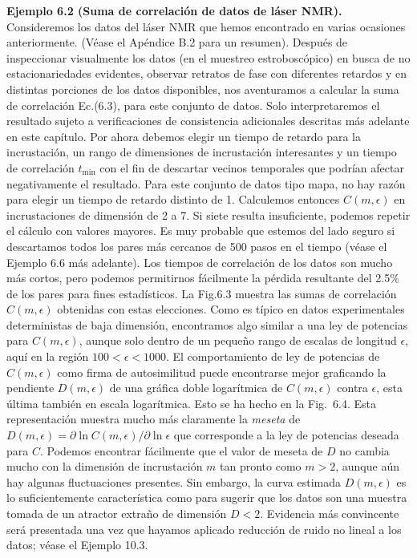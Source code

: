\documentclass[10pt,a4paper]{book}
\begin{document}
\textbf{Ejemplo 6.2 (Suma de correlación de datos de láser NMR).} Consideremos los datos del láser NMR que hemos encontrado en varias ocasiones anteriormente. (Véase el Apéndice B.2 para un resumen). Después de inspeccionar visualmente los datos (en el muestreo estroboscópico) en busca de no estacionariedades evidentes, observar retratos de fase con diferentes retardos y en distintas porciones de los datos disponibles, nos aventuramos a calcular la suma de correlación Ec.(6.3), para este conjunto de datos. Solo interpretaremos el resultado sujeto a verificaciones de consistencia adicionales descritas más adelante en este capítulo. Por ahora debemos elegir un tiempo de retardo para la incrustación, un rango de dimensiones de incrustación interesantes y un tiempo de correlación $t_{\min}$ con el fin de descartar vecinos temporales que podrían afectar negativamente el resultado. Para este conjunto de datos tipo mapa, no hay razón para elegir un tiempo de retardo distinto de 1. Calculemos entonces $C(m, \epsilon)$ en incrustaciones de dimensión de 2 a 7. Si siete resulta insuficiente, podemos repetir el cálculo con valores mayores. Es muy probable que estemos del lado seguro si descartamos todos los pares más cercanos de 500 pasos en el tiempo (véase el Ejemplo 6.6 más adelante). Los tiempos de correlación de los datos son mucho más cortos, pero podemos permitirnos fácilmente la pérdida resultante del 2.5\% de los pares para fines estadísticos. La Fig.6.3 muestra las sumas de correlación $C(m, \epsilon)$ obtenidas con estas elecciones. Como es típico en datos experimentales deterministas de baja dimensión, encontramos algo similar a una ley de potencias para $C(m, \epsilon)$, aunque solo dentro de un pequeño rango de escalas de longitud $\epsilon$, aquí en la región $100 < \epsilon < 1000$. El comportamiento de ley de potencias de $C(m, \epsilon)$ como firma de autosimilitud puede encontrarse mejor graficando la pendiente $D(m, \epsilon)$ de una gráfica doble logarítmica de $C(m, \epsilon)$ contra $\epsilon$, esta última también en escala logarítmica. Esto se ha hecho en la Fig.~6.4. Esta representación muestra mucho más claramente la \textit{meseta} de $D(m, \epsilon) = \partial \ln C(m, \epsilon) / \partial \ln \epsilon$ que corresponde a la ley de potencias deseada para $C$. Podemos encontrar fácilmente que el valor de meseta de $D$ no cambia mucho con la dimensión de incrustación $m$ tan pronto como $m > 2$, aunque aún hay algunas fluctuaciones presentes. Sin embargo, la curva estimada $D(m, \epsilon)$ es lo suficientemente característica como para sugerir que los datos son una muestra tomada de un atractor extraño de dimensión $D < 2$. Evidencia más convincente será presentada una vez que hayamos aplicado reducción de ruido no lineal a los datos; véase el Ejemplo 10.3.
\end{document}
